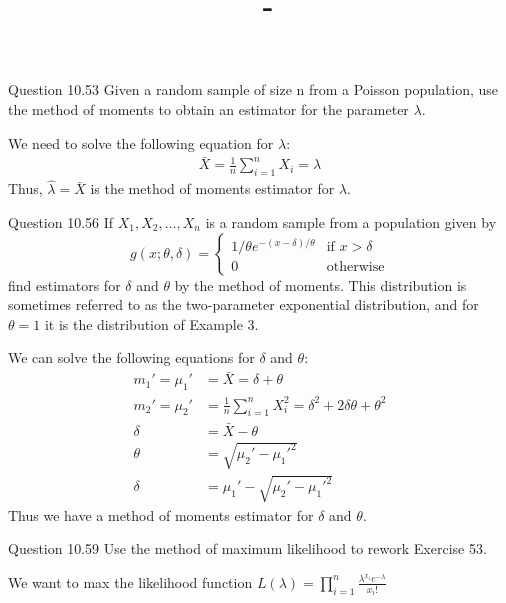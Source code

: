 \documentclass[answers,12pt,addpoints]{exam}
\author{\name}
\title{\course \ - \assignment}
\begin{document}
\maketitle


\newpage
\begin{questions}
    \question Question 10.53
    Given a random sample of size n from a Poisson population, use the method of moments to obtain an estimator
    for the parameter $\lambda$.
    \begin{solution}
        We need to solve the following equation for $\lambda$:
        \begin{align*}
            \bar{X} = \frac{1}{n} \sum_{i=1}^{n} X_i = \lambda
        \end{align*}
        Thus, $\hat{\lambda} = \bar{X}$ is the method of moments estimator for $\lambda$.
    \end{solution}
    \question Question 10.56
    If $X_1, X_2, \ldots, X_n$ is a random sample from a population given by 
    $$g(x; \theta, \delta) = \begin{cases}
    1/\theta e^{-(x - \delta)/\theta} & \text{if } x > \delta \\
    0 & \text{otherwise}
    \end{cases}$$
    find estimators for $\delta$ and $\theta$ by the method of moments.
    This distribution is sometimes referred to as the two-parameter exponential distribution, and for $\theta = 1$ it is
    the distribution of Example 3.
    \begin{solution}
        We can solve the following equations for $\delta$ and $\theta$:
        \begin{align*}
            m_1' = \mu_1' &= \bar{X} = \delta + \theta   \\
            m_2' = \mu_2' &= \frac{1}{n} \sum_{i=1}^{n} X_i^2 = \delta^2 + 2\delta\theta + \theta^2\\
            \delta &= \bar{X} - \theta \\
            \theta &= \sqrt{\mu_2' - \mu_1'^2}\\
            \delta &= \mu_1' - \sqrt{\mu_2' - \mu_1'^2}
        \end{align*}
        Thus we have a method of moments estimator for $\delta$ and $\theta$.
    \end{solution}
    \question Question 10.59
    Use the method of maximum likelihood to rework Exercise 53.
    \begin{solution}
        We want to max the likelihood function $L(\lambda) = \prod_{i=1}^{n} \frac{\lambda^{x_i} e^{-\lambda}}{x_i!} $ 

\end{solution}
\end{questions}
\end{document}
